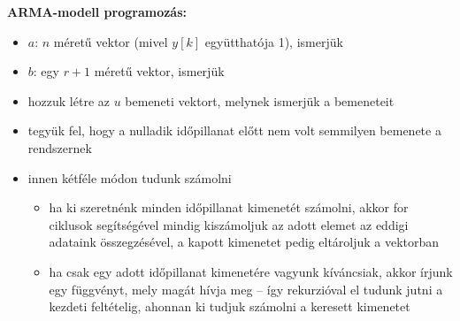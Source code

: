 \textbf{ARMA-modell programozás:}
\begin{itemize}
    \item $a$: $n$ méretű vektor (mivel $y[k]$ együtthatója 1), ismerjük
    \item $b$: egy $r+1$ méretű vektor, ismerjük
    \item hozzuk létre az $u$ bemeneti vektort, melynek ismerjük a bemeneteit
    \item tegyük fel, hogy a nulladik időpillanat előtt nem volt semmilyen bemenete a rendszernek
    \item innen kétféle módon tudunk számolni
    \begin{itemize}
        \item ha ki szeretnénk minden időpillanat kimenetét számolni, akkor for ciklusok segítségével mindig kiszámoljuk az adott elemet az eddigi adataink összegzésével, a kapott kimenetet pedig eltároljuk a vektorban
        \item ha csak egy adott időpillanat kimenetére vagyunk kíváncsiak, akkor írjunk egy függvényt, mely magát hívja meg -- így rekurzióval el tudunk jutni a kezdeti feltételig, ahonnan ki tudjuk számolni a keresett kimenetet
    \end{itemize}
\end{itemize}